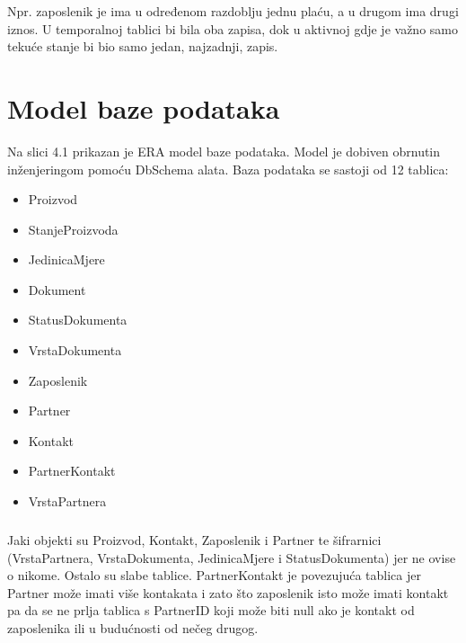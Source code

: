 \documentclass[a4paper,12pt]{foi}
\begin{document}
Npr. zaposlenik je ima u određenom razdoblju jednu plaću, a u drugom ima drugi iznos. U temporalnoj tablici bi bila oba zapisa, dok u aktivnoj gdje je važno samo tekuće stanje bi bio samo jedan, najzadnji, zapis.


\chapter{Model baze podataka}

Na slici 4.1 prikazan je ERA model baze podataka. Model je dobiven obrnutin inženjeringom pomoću DbSchema alata. Baza podataka se sastoji od 12 tablica: 

\begin{itemize}
	\item Proizvod
	\item Stanje\textunderscore Proizvoda
	\item Jedinica\textunderscore Mjere
	\item Dokument
	\item Status\textunderscore Dokumenta
	\item Vrsta\textunderscore Dokumenta
	\item Zaposlenik
	\item Partner
	\item Kontakt
	\item Partner\textunderscore Kontakt
	\item Vrsta\textunderscore Partnera
\end{itemize}

\paragraph{}
Jaki objekti su Proizvod, Kontakt, Zaposlenik i Partner te šifrarnici (Vrsta\textunderscore Partnera, Vrsta\textunderscore Dokumenta, Jedinica\textunderscore Mjere i Status\textunderscore Dokumenta) jer ne ovise o nikome. Ostalo su slabe tablice. Partner\textunderscore Kontakt je povezujuća tablica jer Partner može imati više kontakata i zato što zaposlenik isto može imati kontakt pa da se ne prlja tablica s PartnerID koji može biti null ako je kontakt od zaposlenika ili u budućnosti od nečeg drugog.
\end{document}
